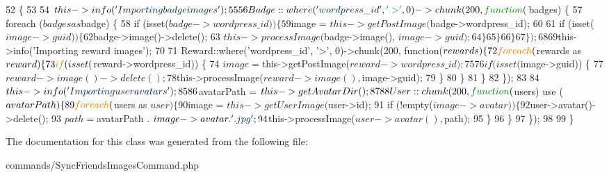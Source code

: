 \begin{DoxyCode}
52     \{
53 
54         $this->info(\textcolor{stringliteral}{'Importing badge images'});
55 
56         Badge::where(\textcolor{stringliteral}{'wordpress\_id'}, \textcolor{charliteral}{'>'}, 0)->chunk(200, \textcolor{keyword}{function}($badges) \{
57             \textcolor{keywordflow}{foreach} ($badges as $badge) \{
58                 \textcolor{keywordflow}{if} (isset($badge->wordpress\_id)) \{
59                     $image = $this->getPostImage($badge->wordpress\_id);
60 
61                     if (isset($image->guid)) \{
62                         $badge->image()->delete();
63                         $this->processImage($badge->image(), $image->guid);
64                     \}
65                 \}
66             \}
67         \});
68 
69         $this->info(\textcolor{stringliteral}{'Importing reward images'});
70 
71         Reward::where(\textcolor{stringliteral}{'wordpress\_id'}, \textcolor{charliteral}{'>'}, 0)->chunk(200, \textcolor{keyword}{function}($rewards) \{
72             \textcolor{keywordflow}{foreach} ($rewards as $reward) \{
73                 \textcolor{keywordflow}{if} (isset($reward->wordpress\_id)) \{
74                     $image = $this->getPostImage($reward->wordpress\_id);
75 
76                     if (isset($image->guid)) \{
77                         $reward->image()->delete();
78                         $this->processImage($reward->image(), $image->guid);
79                     \}
80                 \}
81             \}
82         \});
83 
84         $this->info(\textcolor{stringliteral}{'Importing user avatars'});
85 
86         $avatarPath = $this->getAvatarDir();
87 
88         User::chunk(200, \textcolor{keyword}{function}($users) use ($avatarPath) \{
89             \textcolor{keywordflow}{foreach} ($users as $user) \{
90                 $image = $this->getUserImage($user->id);
91                 \textcolor{keywordflow}{if} (!empty($image->avatar)) \{
92                     $user->avatar()->delete();
93                     $path = $avatarPath . $image->avatar . \textcolor{stringliteral}{'.jpg'};
94                     $this->processImage($user->avatar(), $path);
95                 \}
96             \}
97         \});
98 
99     \}
\end{DoxyCode}


The documentation for this class was generated from the following file\+:\begin{DoxyCompactItemize}
\item 
commands/Sync\+Friends\+Images\+Command.\+php\end{DoxyCompactItemize}
